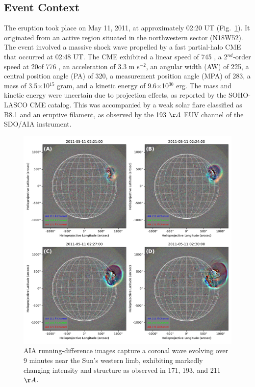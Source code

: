 \subsection{Event Context}
The eruption took place on May 11, 2011, at approximately 02:20 UT (Fig.~\ref{fig_aia_event}). It originated from an active region situated in the northwestern sector (N18W52). The event involved a massive shock wave propelled by a fast partial-halo CME that occurred at 02:48 UT. The CME exhibited a linear speed of 745 \kms, a 2$^{nd}$-order speed at 20\rsun of 776 \kms, an acceleration of 3.3 m s$^{-2}$, an angular width (AW) of 225\degree, a central position angle (PA) of 320\degree, a measurement position angle (MPA) of 283\degree, a mass of 3.5$\times$10$^{15}$ gram, and a kinetic energy of 9.6$\times$10$^{30}$ erg. The mass and kinetic energy were uncertain due to projection effects, as reported by the SOHO-LASCO CME catalog. This was accompanied by a weak solar flare classified as B8.1 and an eruptive filament, as observed by the 193 $\AA$ EUV channel of the SDO/AIA instrument.

\begin{figure}[!htp] %
	\centerline{\includegraphics[width=0.8\columnwidth]{chapter2/figs/RGB_panel.pdf}}
	\caption{AIA running-difference images capture a coronal wave evolving over 9 minutes near the Sun's western limb, exhibiting markedly changing intensity and structure as observed in 171, 193, and 211 $\AA$.}
	\label{fig_aia_event}
\end{figure}

